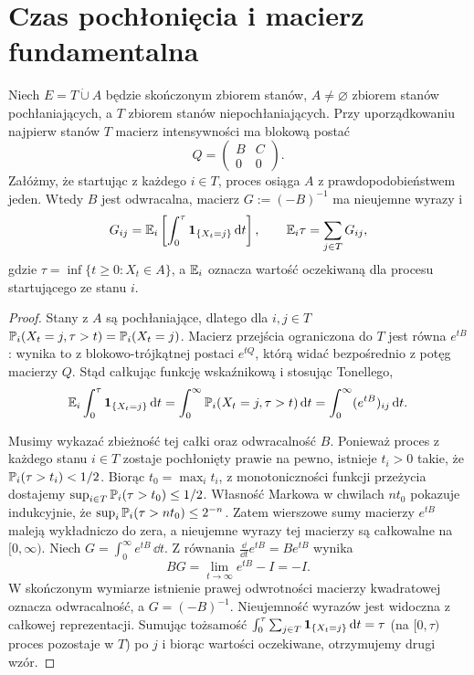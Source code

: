 \section{Czas pochłonięcia i macierz fundamentalna}
\begin{twierdzenie}
\label{thm:ctmc-absorption}
Niech $E=T\mathbin{\dot\cup}A$ będzie skończonym zbiorem stanów,
$A\ne\varnothing$ zbiorem stanów pochłaniających,
a $T$ zbiorem stanów niepochłaniających. Przy uporządkowaniu
najpierw stanów $T$ macierz intensywności ma blokową postać
\[
Q=\begin{pmatrix}B&C\\0&0\end{pmatrix}.
\]
Załóżmy, że startując z każdego $i\in T$, proces
osiąga $A$ z prawdopodobieństwem jeden.
Wtedy $B$ jest odwracalna, macierz
$G:=(-B)^{-1}$ ma nieujemne wyrazy i
\[
G_{ij}=\mathbb{E}_i\left[\int_0^\tau\mathbf{1}_{\{X_t=j\}}\,\mathrm{d} t\right],
\qquad
\mathbb{E}_i\tau=\sum_{j\in T}G_{ij},
\]
gdzie $\tau=\inf\{t\ge0:X_t\in A\}$, a
$\mathbb{E}_i$ oznacza wartość oczekiwaną dla procesu
startującego ze stanu $i$.
\end{twierdzenie}
\begin{proof}
Stany z $A$ są pochłaniające, dlatego dla $i,j\in T$
$\mathbb{P}_i(X_t=j,\tau>t)=\mathbb{P}_i(X_t=j)$.
Macierz przejścia ograniczona do $T$ jest równa $e^{tB}$:
wynika to z blokowo-trójkątnej postaci $e^{tQ}$,
którą widać bezpośrednio z potęg macierzy $Q$.
Stąd całkując funkcję wskaźnikową i stosując Tonellego,
\[
\mathbb{E}_i\int_0^\tau\mathbf{1}_{\{X_t=j\}}\,\mathrm{d} t
=\int_0^\infty\mathbb{P}_i(X_t=j,\tau>t)\,\mathrm{d} t
=\int_0^\infty(e^{tB})_{ij}\,\mathrm{d} t.
\]

Musimy wykazać zbieżność tej całki oraz odwracalność $B$.
Ponieważ proces z każdego stanu $i\in T$ zostaje pochłonięty
prawie na pewno, istnieje $t_i>0$ takie, że
$\mathbb{P}_i(\tau>t_i)<1/2$. Biorąc $t_0=\max_i t_i$,
z monotoniczności funkcji przeżycia dostajemy
$\sup_{i\in T}\mathbb{P}_i(\tau>t_0)\le1/2$.
Własność Markowa w chwilach $nt_0$ pokazuje indukcyjnie,
że $\sup_i\mathbb{P}_i(\tau>nt_0)\le2^{-n}$.
Zatem wierszowe sumy macierzy $e^{tB}$ maleją
wykładniczo do zera, a nieujemne wyrazy tej macierzy
są całkowalne na $[0,\infty)$. Niech
$G=\int_0^\infty e^{tB}\,\dd t$.
Z równania $\frac{\dd}{\dd t}e^{tB}=Be^{tB}$ wynika
\[
BG=\lim_{t\to\infty}e^{tB}-I=-I.
\]
W skończonym wymiarze istnienie prawej odwrotności
macierzy kwadratowej oznacza odwracalność, a
$G=(-B)^{-1}$. Nieujemność wyrazów jest widoczna
z całkowej reprezentacji. Sumując tożsamość
$\int_0^\tau\sum_{j\in T}\mathbf{1}_{\{X_t=j\}}\,\mathrm{d} t=\tau$
(na $[0,\tau)$ proces pozostaje w $T$)
po $j$ i biorąc wartości oczekiwane,
otrzymujemy drugi wzór.
\end{proof}

